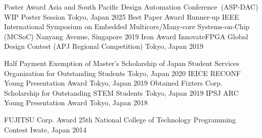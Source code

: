 

\begin{cvhonors}
  \cvhonor
    {Poster Award} %
    {Asia and South Pacific Design Automation Conference~(ASP-DAC) WIP Poster Session} %
    {Tokyo, Japan} %
    {2025} %
  \cvhonor
    {Best Paper Award Runner-up} %
    {IEEE International Symposium on Embedded Multicore/Many-core Systems-on-Chip (MCSoC)} %
    {Nanyang Avenue, Singapore} %
    {2019} %
  \cvhonor
    {Iron Award} %
    {InnovateFPGA Global Design Contest (APJ Regional Competition)} %
    {Tokyo, Japan} %
    {2019} %
\end{cvhonors}


\begin{cvhonors}
  \cvact
    {Half Payment Exemption of Master's Scholarship of Japan Student Services Organization for Outstanding Students} %
    {} 
    {Tokyo, Japan} %
    {2020} %
  \cvact
    {IEICE RECONF Young Presentation Award} %
    {} %
    {Tokyo, Japan} %
    {2019} %
  \cvact
    {Obtained Fixters Corp. Scholarship for Outstanding STEM Students} %
    {} 
    {Tokyo, Japan} %
    {2019} %
  \cvact
    {IPSJ ARC Young Presentation Award} %
    {} %
    {Tokyo, Japan} %
    {2018} %

  \cvhonor
    {FUJITSU Corp. Award} %
    {25th National College of Technology Programming Contest } %
    {Iwate, Japan} %
    {2014} %
    

\end{cvhonors}

